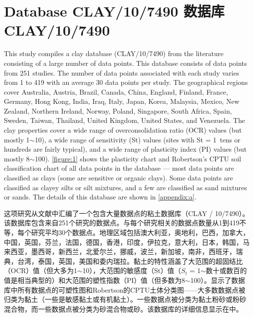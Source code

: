 \section{Database CLAY/10/7490 数据库CLAY/10/7490}

\begin{paracol}{2}
    
    This study compiles a clay database (CLAY/10/7490) from the literature consisting of a large number of data points. This database consists of data points from 251 studies. The number of data points associated with each study varies from 1 to 419 with an average 30 data points per study. The geographical regions cover Australia, Austria, Brazil, Canada, China, England, Finland, France, Germany, Hong Kong, India, Iraq, Italy, Japan, Korea, Malaysia, Mexico, New Zealand, Northern Ireland, Norway, Poland, Singapore, South Africa, Spain, Sweden, Taiwan, Thailand, United Kingdom, United States, and Venezuela. The clay properties cover a wide range of overconsolidation ratio (OCR) values (but mostly 1$\sim$10), a wide range of sensitivity (St) values (sites with St = 1~tens or hundreds are fairly typical), and a wide range of plasticity index (PI) values (but mostly 8$\sim$100). \autoref{figure:1} shows the plasticity chart and Robertson’s CPTU soil classification chart \citep{Robertson1990151} of all data points in the database — most data points are classified as clays (some are sensitive or organic clays). Some data points are classified as clayey silts or silt mixtures, and a few are classified as sand mixtures or sands. The details of this database are shown in \autoref{appendix:a}.
    
    \switchcolumn
    
    这项研究从文献中汇编了一个包含大量数据点的粘土数据库（CLAY / 10/7490）。该数据库包含来自251个研究的数据点。与每个研究相关的数据点数量从1到419不等，每个研究平均30个数据点。地理区域包括澳大利亚，奥地利，巴西，加拿大，中国，英国，芬兰，法国，德国，香港，印度，伊拉克，意大利，日本，韩国，马来西亚，墨西哥，新西兰，北爱尔兰，挪威，波兰，新加坡，南非，西班牙，瑞典，台湾，泰国，英国，美国和委内瑞拉。黏土的特性涵盖了大范围的超固结比（OCR）值（但大多为1$\sim$10），大范围的敏感度（St）值（$S_t$ = 1$\sim$数十或数百的值是相当典型的）和大范围的塑性指数（PI）值（但多数为8$\sim$100）。显示了数据库中所有数据点的可塑性图和Robertson的CPTU土体分类图\citep{Robertson1990151}——大多数数据点被归类为黏土（一些是敏感黏土或有机黏土）。一些数据点被分类为黏土粉砂或粉砂混合物，而一些数据点被分类为砂混合物或砂。该数据库的详细信息显示在中。
\end{paracol}

